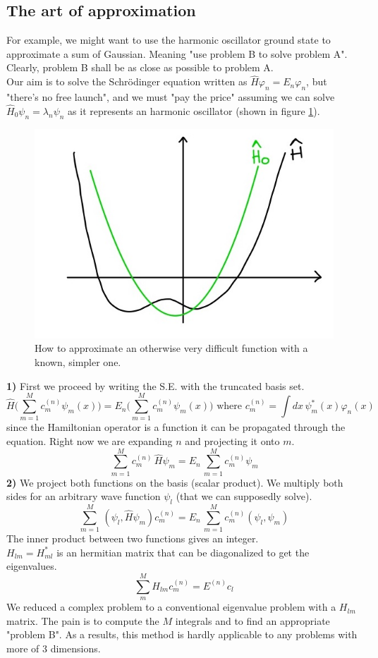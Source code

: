 \subsection{The art of approximation}
For example, we might want to use the harmonic oscillator ground state to approximate a sum of Gaussian. Meaning "use problem B to solve problem A". Clearly, problem B shall be as close as possible to problem A.\\
Our aim is to solve the Schr{\"o}dinger equation written as $\hat{H}\varphi_n=E_n\varphi_n$, but "there's no free launch", and we must "pay the price" assuming we can solve $\hat{H}_0\psi_n=\lambda_n\psi_n$ as it represents an harmonic oscillator (shown in figure \ref{fig:approximation}).\\
\begin{figure}[htbp!]
\includegraphics[scale=0.20]{img_1.jpg}
\caption{How to approximate an otherwise very difficult function with a known, simpler one.}
\label{fig:approximation}
\end{figure}
\textbf{1)} First we proceed by writing the S.E. with the truncated basis set.
\[
\hat{H}\bigg(\sum_{m=1}^{M}c_m^{(n)}\psi_m(x)\bigg)=E_n\bigg(\sum_{m=1}^{M}c_m^{(n)}\psi_m(x)\bigg)
\text{ where $c_m^{(n)}=\int dx\,\psi_m^*(x)\varphi_n(x)$}
\]
since the Hamiltonian operator is a function it can be propagated through the equation. Right now we are expanding $n$ and projecting it onto $m$.\\
\[
\sum_{m=1}^{M}c_m^{(n)}\,\hat{H}\psi_m=E_n\,\sum_{m=1}^{M}c_m^{(n)}\psi_m\]
\textbf{2)} We project both functions on the basis (scalar product). We multiply both sides for an arbitrary wave function $\psi_l$ (that we can supposedly solve).
\[\sum_{m=1}^{M}\,(\psi_l,\hat{H}\psi_m)c_m^{(n)}=E_n\,\sum_{m=1}^{M}c_m^{(n)}(\psi_l,\psi_m)
\]
The inner product between two functions gives an integer. \\
$H_{lm}=H_{ml}^*$ is an hermitian matrix that can be diagonalized to get the eigenvalues.\\
\[
\sum_{m}^{M}H_{lm}c_m^{(n)}=E^{(n)}c_l
\]
We reduced a complex problem to a conventional eigenvalue problem with a $H_{lm}$ matrix. The pain is to compute the $M$ integrals and to find an appropriate "problem B". As a results, this method is hardly applicable to any problems with more of 3 dimensions. \\

